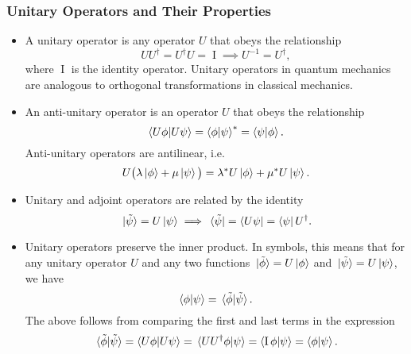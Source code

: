 \documentclass[11pt, a4paper]{article}
\renewcommand{\t}[1]{\tilde{#1}}
\newcommand{\II}{\operatorname{I}}  %
\newcommand{\p}{\psi}  %
\begin{document}
\subsubsection{Unitary Operators and Their Properties}
\begin{itemize}

	\item A unitary operator is any operator $ U $ that obeys the relationship
	\begin{equation*}
		UU^{\dagger} = U^{\dagger}U = \II \implies U^{-1} = U^{\dagger},
	\end{equation*}
    where $ \II $ is the identity operator. Unitary operators in quantum mechanics are analogous to orthogonal transformations in classical mechanics.

    \item An anti-unitary operator is an operator $ U $ that obeys the relationship
    \begin{equation*}
        \braket{U\phi}{U\psi} = \braket{\phi}{\psi}^{*}= \braket{\psi}{\phi}.
    \end{equation*}
    Anti-unitary operators are antilinear, i.e.
    \begin{equation*}
        U\big(\lambda \ket{\phi} + \mu \ket{\psi}\big) = \lambda^{*}U\ket{\phi} + \mu^{*}U\ket{\psi}.
    \end{equation*}

	\item Unitary and adjoint operators are related by the identity
    \begin{equation*}
        \ket*{\tilde{\psi}} = U \ket{\psi} \implies \bra*{\tilde{\psi}} = \bra{U \psi} = \bra{\psi} U^{\dagger}.
    \end{equation*}
	
	\item Unitary operators preserve the inner product. In symbols, this means that for any unitary operator $ U $ and any two functions $ \ket*{\t{\phi}} = U\ket{\phi} $ and $ \ket*{\t{\p}} = U \ket{\p} $, we have
	\begin{equation*}
		\braket{\phi}{\p} = \braket*{\t{\phi}}{\t{\p}}.
	\end{equation*}
	The above follows from comparing the first and last terms in the expression
    \begin{equation*}
        \braket*{\t{\phi}}{\t{\p}} = \braket{U\phi}{U\p} = \braket*{UU^{\dagger}\phi}{\p} = \braket{\II \phi}{\psi} = \braket{\phi}{\p}.
    \end{equation*}
    

\end{itemize}
\end{document}
